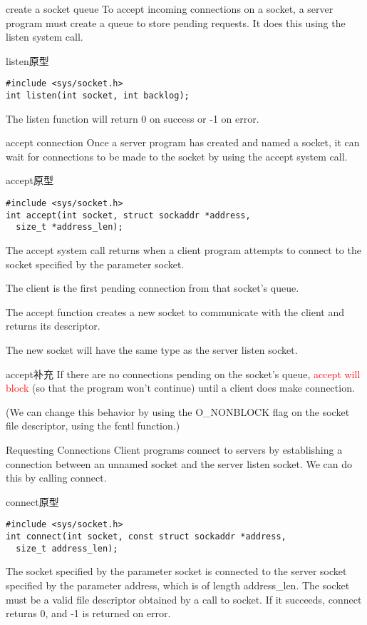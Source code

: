 \documentclass{beamer}
\begin{document}
\begin{frame}[fragile]{create a socket queue}
To accept incoming connections on a socket, a server program must create a queue to store pending requests. It does this using the listen system call.
\begin{block}{listen原型}
\begin{verbatim}
#include <sys/socket.h>
int listen(int socket, int backlog);
\end{verbatim}
\end{block}
The listen function will return 0 on success or -1 on error.
\end{frame}

\begin{frame}[fragile]{accept connection}
Once a server program has created and named a socket, it can wait for connections to be made to the socket by using the accept system call.
\begin{block}{accept原型}
\begin{verbatim}
#include <sys/socket.h>
int accept(int socket, struct sockaddr *address, 
  size_t *address_len);
\end{verbatim}
\end{block}
The accept system call returns when a client program attempts to connect to the socket specified by the parameter socket. 

The client is the first pending connection from that socket’s queue. 

The accept function creates a new socket to communicate with the client and returns its descriptor. 

The new socket will have the same type as the server listen socket.
\end{frame}
\begin{frame}{accept补充}
If there are no connections pending on the socket’s queue, \textcolor{red}{accept will block }(so that the program won’t continue) until a client does make connection. 

(We can change this behavior by using the O\_NONBLOCK flag on the socket file descriptor, using the fcntl function.)
\end{frame}
\begin{frame}[fragile]{Requesting Connections}
Client programs connect to servers by establishing a connection between an unnamed socket and the server listen socket. We can do this by calling connect.
\begin{block}{connect原型}
\begin{verbatim}
#include <sys/socket.h>
int connect(int socket, const struct sockaddr *address, 
  size_t address_len);
\end{verbatim}
\end{block}
The socket specified by the parameter socket is connected to the server socket specified by the parameter address, which is of length address\_len. The socket must be a valid file descriptor obtained by a call to socket.
If it succeeds, connect returns 0, and -1 is returned on error. 
\end{frame}
\end{document}
